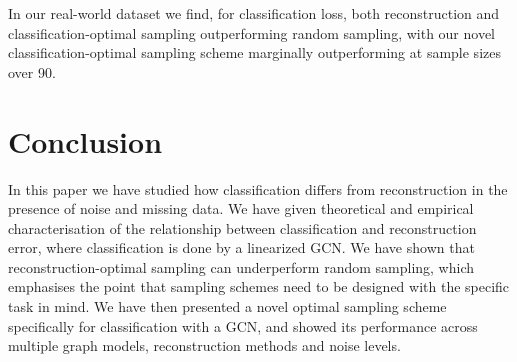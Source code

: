 In our real-world dataset  we find, for classification loss, both reconstruction and classification-optimal sampling outperforming random sampling, with our novel classification-optimal sampling scheme marginally outperforming at sample sizes over 90.





\section{Conclusion}
In this paper we have studied how classification differs from reconstruction in the presence of noise and missing data. We have given theoretical and empirical characterisation of the relationship between classification and reconstruction error, where classification is done by a linearized GCN. We have shown that reconstruction-optimal sampling can underperform random sampling, which emphasises the point that sampling schemes need to be designed with the specific task in mind. We have then presented a novel optimal sampling scheme specifically for classification with a GCN, and showed its performance across multiple graph models, reconstruction methods and noise levels.
